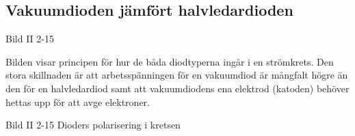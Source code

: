 
\subsection{Vakuumdioden jämfört halvledardioden}

Bild II 2-15

Bilden visar principen för hur de båda diodtyperna ingår i en strömkrets. Den
stora skillnaden är att arbetsspänningen för en vakuumdiod är mångfalt högre än
den för en halvledardiod samt att vakuumdiodens ena elektrod (katoden) behöver
hettas upp för att avge elektroner.

Bild II 2-15 Dioders polarisering i kretsen
